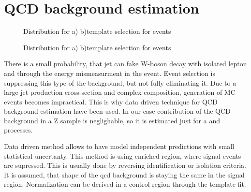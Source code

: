\section{QCD background estimation}\label{sec:QCD}


\begin{figure}[!tbp]
\begin{minipage}[h]{0.49\linewidth}
\end{minipage}
\hfill
\begin{minipage}[h]{0.49\linewidth}
\end{minipage}
\caption{Distribution for a) \etmiss b)\mtw template selection  for \wenu events}
\label{ris:TemplateE}

\vfill

\begin{minipage}[h]{0.49\linewidth}
\end{minipage}
\hfill
\begin{minipage}[h]{0.49\linewidth}
\end{minipage}
\caption{Distribution for a) \etmiss b)\mtw template selection  for \wmunu events}
\label{ris:TemplateMu}
\end{figure}

There is a small probability, that jet can fake W-boson decay with isolated lepton and \etmiss through the energy mismeasurment in the event.  Event selection is suppressing this type of the background, but not fully eliminating it. Due to a large jet production cross-section and complex composition, generation of MC events becomes impractical. This is why data driven technique for QCD background estimation have been used. In our case contribution of the QCD background  in a Z sample is neglighable, so it is estimated just for a \wenu and \wmunu processes. 

Data driven method allows to have model independent predictions with small statistical uncertanty. This method is using \qcd enriched region, where signal events are supressed. This is usually done by reversing identification or isolation criteria. It is assumed, that shape of the qcd background is staying the same in the signal region. Normalization can  be derived in a control region through the template fit. 

